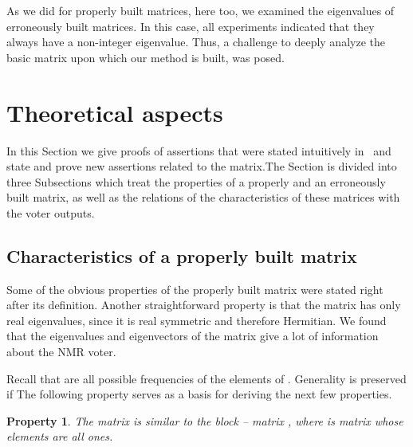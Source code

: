 \documentclass[technote, a4paper, onecolumn]{IEEEtran}  \newcommand{\avtor}{Aleksandar Simevski}
\newtheorem{property}{Property}
\begin{document}
As we did for properly built matrices, here too, we examined the eigenvalues of erroneously built matrices. In this case, all experiments indicated that they always have a non-integer eigenvalue. Thus, a challenge to deeply analyze the basic matrix upon which our method is built, was posed. 



\section{Theoretical aspects}\label{sec_results}

\newcommand{\be}{}
\newcommand{\ds}{\displaystyle}



In this Section we give proofs of assertions that were stated intuitively in~\cite{Simevski2012a} and state and prove new assertions related to the matrix.The Section is divided into three Subsections which treat the properties of a properly and an erroneously built matrix, as well as the relations of the characteristics of these matrices with the voter outputs.

\subsection{Characteristics of a properly built matrix}\label{properly_matrix}
\medskip













Some of the obvious properties of the properly built  matrix   were stated right after its definition. Another straightforward property is that the matrix has only real eigenvalues, since it is real symmetric and therefore  Hermitian. We found that the eigenvalues and eigenvectors of the  matrix give a lot of information about the NMR voter.





\medskip
Recall that  are all possible frequencies of the elements of  . Generality is preserved if  The following property serves as a basis for deriving the next few properties.

\medskip
\begin{property}\label{prop_similar}
The  matrix is similar to the block -- matrix
, where  is
 matrix whose elements are all ones.
\end{property}
\end{document}

